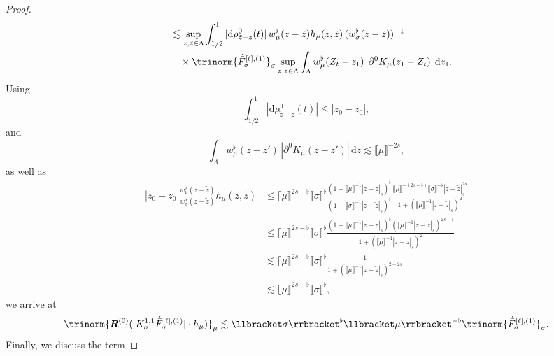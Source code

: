 \documentclass{article}
\numberwithin{equation}{section}
\newcommand{\mathd}{\mathrm{d}}
\theoremstyle{plain}
\theoremstyle{definition}
\begin{document}
\begin{proof}
\begin{align*}
    &\quad \lesssim  
    \sup_{z, \tilde{z} \in \Lambda}
    \int_{1 / 2}^1 | \mathd \rho^0_{\tilde{z} - z}  (t)|\,
    w_{\mu}^{\flat} (z - \tilde{z}) h_{\mu} (z, \tilde{z})
    \,(w_{\sigma}^{\flat} (z - \tilde{z}))^{- 1}\\
    &\qquad \times \trinorm{ \dot{\bar{F}}_{\sigma}^{[\ell], (1)}
    }_{\sigma} \sup_{z, \tilde{z} \in \Lambda} \int_{\Lambda}
    w_{\mu}^{\flat} (Z_t - z_1)\,
    | \partial^0 K_{\mu} (z_1 -Z_t) |\,\mathd z_1 .
  \end{align*}
  Using
  \[ \int_{1 / 2}^1 |\mathd \rho_{\tilde{z} - z}^0 (t)| \leqslant | \tilde{z}_0
     - z_0 |, \]
  and
  \[ {\int_{\Lambda}}  w_{\mu}^{\flat} (z  - z') \, | \partial^0 K_{\mu} (z - z'
     ) |\,\mathd z \lesssim \llbracket \mu \rrbracket^{- 2 s}, \]
  as well as
  \begin{align*}
       | \tilde{z}_0 - z_0 | \frac{w_{\mu}^{\flat} (z -
       \tilde{z})}{w_{\sigma}^{\flat} (z - \tilde{z})} h_{\mu} (z, \tilde{z}) &
       \leqslant  \llbracket \mu \rrbracket^{2 s - \flat} \llbracket \sigma
       \rrbracket^{\flat} \frac{\left( 1 + \llbracket \mu \rrbracket^{- 1}
       | z - \tilde{z} |_s  \right)^{\flat}}{(1 + \llbracket
       \sigma \rrbracket^{- 1} | z - \tilde{z} |_s)^{\flat}} \frac{\llbracket
       \mu \rrbracket^{- (2 s - \flat)} \llbracket \sigma \rrbracket^{- \flat}
       | z - \tilde{z} |_s^{2 s}}{1 + {(\llbracket \mu \rrbracket^{- 1} | z -
       \tilde{z} |_s)^2} }\\
       & \leqslant  \llbracket \mu \rrbracket^{2 s - \flat} \llbracket
       \sigma \rrbracket^{\flat} \frac{\left( 1 + \llbracket \mu \rrbracket^{-
       1} | z - \tilde{z} |_s  \right)^{\flat} (\llbracket \mu
       \rrbracket^{- 1} | z - \tilde{z} |_s)^{2 s - \flat}}{1 + {(\llbracket
       \mu \rrbracket^{- 1} | z - \tilde{z} |_s)^2} }\\
       & \lesssim  \llbracket \mu \rrbracket^{2 s - \flat} \llbracket \sigma
       \rrbracket^{\flat} \frac{1}{1 + {(\llbracket \mu \rrbracket^{- 1} | z -
       \tilde{z} |_s)^{2 - 2 s}} }\\
       & \lesssim  \llbracket \mu \rrbracket^{2 s - \flat} \llbracket \sigma
       \rrbracket^{\flat},
     \end{align*}
  we arrive at
  \[ \trinorm{ \boldsymbol{R}^{(0)} ([K^{1, 1}_{\sigma}
     \dot{\bar{F}}_{\sigma}^{[\ell], (1)}] \cdot h_{\mu}) }_{\mu}
     \lesssim \llbracket \sigma \rrbracket^{\flat} \llbracket \mu
     \rrbracket^{- \flat}  \trinorm{ \dot{\bar{F}}_{\sigma}^{[\ell], (1)}
     }_{\sigma} . \]
  Finally, we discuss the term

\end{proof}
\end{document}
